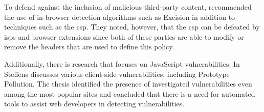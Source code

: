 To defend against the inclusion of malicious third-party content, \citeauthor*{InBrowserDetection} recommended the use of in-browser detection algorithms such as Excision in addition to techniques such as the \ac{csp}. They noted, however, that the \ac{csp} can be defeated by \acp{isp} and browser extensions since both of these parties are able to modify or remove the headers that are used to define this policy.

Additionally, there is research that focuses on JavaScript vulnerabilities. In \cite{Steffens_2021} Steffens discusses various client-side vulnerabilities, including Prototype Pollution. The thesis identified the presence of investigated vulnerabilities even among the most popular sites and concluded that there is a need for automated tools to assist web developers in detecting vulnerabilities. \cite{Steffens_2021}
